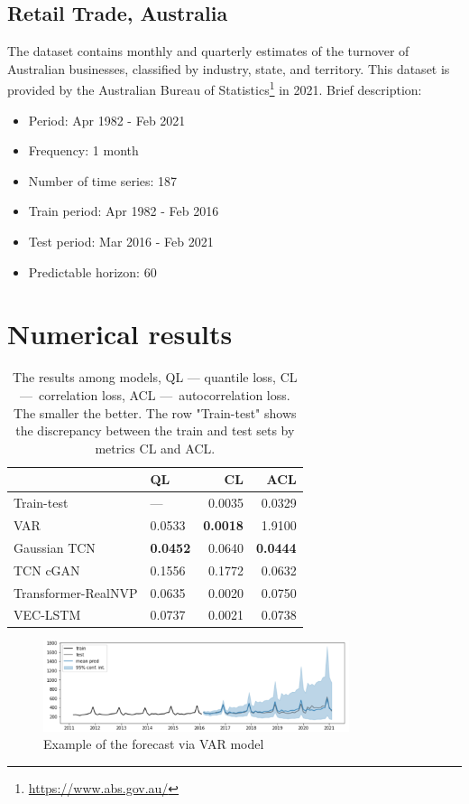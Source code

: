 \documentclass[12pt,a4paper]{article}
\begin{document}
\subsection{Retail Trade, Australia}
The dataset contains monthly and quarterly estimates of the turnover of Australian businesses, classified by industry, state, and territory. This dataset is provided by the Australian Bureau of Statistics\footnote{\url{https://www.abs.gov.au/}} in 2021. Brief description:
\begin{itemize}
    \item Period: Apr 1982 - Feb 2021
    \item Frequency: 1 month
    \item Number of time series: 187
    \item Train period: Apr 1982 - Feb 2016
    \item Test period: Mar 2016 - Feb 2021
    \item Predictable horizon: 60 
\end{itemize}

\section{Numerical results}

\begin{table}
\centering
\begin{tabular}{llrr}
\toprule
{} &      QL &      CL &     ACL \\
\midrule
Train-test          &       — &  0.0035 &  0.0329 \\
VAR                 &  0.0533 &  \textbf{0.0018} &  1.9100 \\
Gaussian TCN        &  \textbf{0.0452} &  0.0640 &  \textbf{0.0444} \\
TCN cGAN            &  0.1556 &  0.1772 &  0.0632 \\
Transformer-RealNVP &  0.0635 &  0.0020 &  0.0750 \\
VEC-LSTM            &  0.0737 &  0.0021 &  0.0738 \\
\bottomrule
\end{tabular}
\caption{The results among models, QL — quantile loss, CL — correlation loss, ACL — autocorrelation loss. The smaller the better. The row "Train-test" shows the discrepancy between the train and test sets by metrics CL and ACL.}
\label{table:1}
\end{table}

\begin{figure}[h!]
    \centering
    \includegraphics[width=0.8\textwidth]{var.png}
    \caption{Example of the forecast via VAR model}
    \label{fig:var}
\end{figure}
\end{document}
